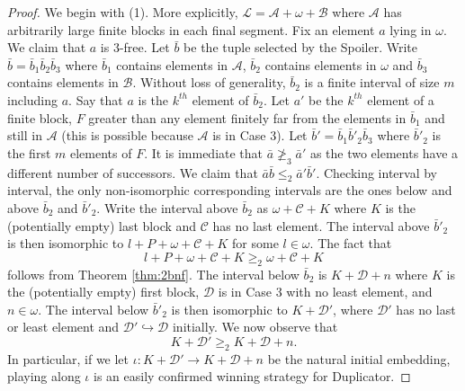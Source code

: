 \documentclass[11pt]{amsart}
\theoremstyle{definition}
\def\A{\mathcal A}
\def\B{\mathcal{B}}
\def\C{\mathcal{C}}
\def\D{{\mathcal D}}
\def\L{\mathcal L}
\begin{document}
\begin{proof}
    We begin with (1).
    More explicitly, $\L=\A+\omega+\B$ where $\A$ has arbitrarily large finite blocks in each final segment.
    Fix an element $a$ lying in $\omega$.
    We claim that $a$ is $3$-free.
    Let $\bar{b}$ be the tuple selected by the Spoiler.
    Write $\bar{b}=\bar{b}_1\bar{b}_2\bar{b}_3$ where $\bar{b}_1$ contains elements in $\A$, $\bar{b}_2$ contains elements in $\omega$ and $\bar{b}_3$ contains elements in $\B$.
    Without loss of generality, $\bar{b}_2$ is a finite interval of size $m$ including $a$.
    Say that $a$ is the $k^{th}$ element of $\bar{b}_2$.
    Let $a'$ be the $k^{th}$ element of a finite block, $F$ greater than any element finitely far from the elements in $\bar{b}_1$ and still in $\A$ (this is possible because $\A$ is in Case 3).
    Let $\bar{b}'=\bar{b}_1\bar{b}'_2\bar{b}_3$ where $\bar{b}'_2$ is the first $m$ elements of $F$.
    It is immediate that $\bar{a}\not\geq_3\bar{a}'$ as the two elements have a different number of successors. 
    We claim that $\bar{a}\bar{b}\leq_2\bar{a}'\bar{b}'$.
    Checking interval by interval, the only non-isomorphic corresponding intervals are the ones below and above $\bar{b}_2$ and $\bar{b}'_2$.
    Write the interval above $\bar{b}_2$ as $\omega+\C+K$ where $K$ is the (potentially empty) last block and $\C$ has no last element.
    The interval above $\bar{b}'_2$ is then isomorphic to $l+P+\omega+\C+K$ for some $l\in\omega$.
    The fact that
    \[l+P+\omega+\C+K\geq_2 \omega+\C+K\]
    follows from Theorem \ref{thm:2bnf}.
    The interval below $\bar{b}_2$ is $K+\D+n$ where $K$ is the (potentially empty) first block, $\D$ is in Case 3 with no least element, and $n\in\omega$.
    The interval below $\bar{b}'_2$ is then isomorphic to $K+\D'$, where $\D'$ has no last or least element and $\D'\hookrightarrow\D$ initially.
    We now observe that
    \[K+\D'\geq_2K+\D+n.\]
    In particular, if we let $\iota: K+\D'\to K+\D+n$ be the natural initial embedding, playing along $\iota$ is an easily confirmed winning strategy for Duplicator.


\end{proof}
\end{document}
